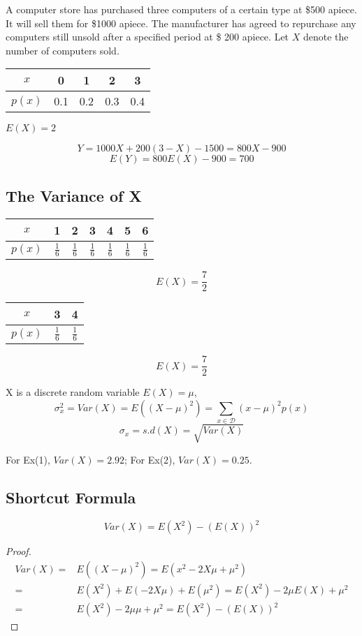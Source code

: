 \begin{exmp}
  A computer store has purchased three computers of a certain type at \$500 apiece. It will sell them for \$1000 apiece. The manufacturer has agreed to repurchase any computers still unsold after a specified period at \$ 200 apiece. Let $X$ denote the number of computers sold.
\begin{center}
\begin{tabular}{c|cccc}
\hline
$x$ & 0 & 1 & 2 & 3 \\
\hline
$p(x)$  & 0.1 & 0.2  & 0.3  & 0.4 \\
\hline
\end{tabular}
\qquad $E(X)=2$
\end{center}

\[	Y=1000X+200(3-X)-1500=800X-900\]
\[	E(Y)=800E(X)-900=700\]
\end{exmp}

\subsection{The Variance of X}
\begin{exmp}
\qquad
\begin{tabular}{c|cccccc}
\hline
$x$ & 1 & 2 & 3 & 4 & 5 & 6 \\
\hline
$p(x)$  & $\frac{1}{6}$ & $\frac{1}{6}$  & $\frac{1}{6}$  & $\frac{1}{6}$ & $\frac{1}{6}$ & $\frac{1}{6}$\\
\hline
\end{tabular}

\[E(X)=\frac{7}{2}\]
  
\begin{center}
\begin{tabular}{c|cc}
\hline
$x$ &  3 & 4  \\
\hline
$p(x)$  & $\frac{1}{6}$ & $\frac{1}{6}$  \\
\hline
\end{tabular}
\end{center}

\[E(X)=\frac{7}{2}\]  
\end{exmp}

\begin{defn}
X is a discrete random variable $E(X)=\mu$, 
\[\sigma_{x}^2=Var(X)=E((X-\mu)^2)=\sum_{x \in \mathcal{D}} (x-\mu)^2p(x)\]
\[\sigma_x=s.d(X)=\sqrt{Var(X)}\]
\end{defn}

For Ex(1), $Var(X)=2.92$; For Ex(2), $Var(X)=0.25$.


\subsection{Shortcut Formula}
\begin{prop}
\[Var(X)=E(X^2)-(E(X))^2\]
\begin{proof}
\begin{align*}
Var(X)=& E((X-\mu)^2)= E(x^2-2X\mu+\mu^2)\\
=&E(X^2)+E(-2X\mu)+E(\mu^2) = E(X^2)-2\mu E(X)+\mu^2 \\
=& E(X^2)-2\mu \mu+\mu^2 = E(X^2)-(E(X))^2
\end{align*}
\end{proof}
\end{prop}

